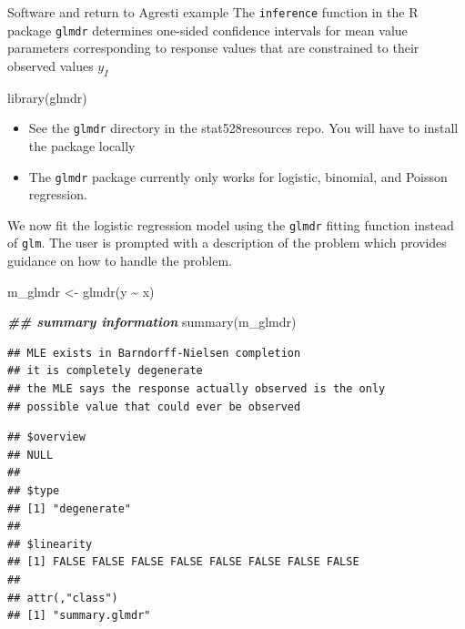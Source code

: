 \documentclass[
  ignorenonframetext,
]{beamer}
\newenvironment{Shaded}{\begin{snugshade}}{\end{snugshade}}
\newcommand{\DocumentationTok}[1]{\textcolor[rgb]{0.56,0.35,0.01}{\textbf{\textit{#1}}}}
\newcommand{\FunctionTok}[1]{\textcolor[rgb]{0.00,0.00,0.00}{#1}}
\newcommand{\NormalTok}[1]{#1}
\newcommand{\OtherTok}[1]{\textcolor[rgb]{0.56,0.35,0.01}{#1}}
\newcommand{\SpecialCharTok}[1]{\textcolor[rgb]{0.00,0.00,0.00}{#1}}
\providecommand{\tightlist}{%
  \setlength{\itemsep}{0pt}\setlength{\parskip}{0pt}}
\begin{document}
\begin{frame}[fragile]{Software and return to Agresti example}
\protect\hypertarget{software-and-return-to-agresti-example}{}
The \texttt{inference} function in the R package \texttt{glmdr}
determines one-sided confidence intervals for mean value parameters
corresponding to response values that are constrained to their observed
values \(y_I\)

\vspace{12pt}
\tiny

\begin{Shaded}
\begin{Highlighting}[]
\FunctionTok{library}\NormalTok{(glmdr)}
\end{Highlighting}
\end{Shaded}

\vspace{12pt}
\normalsize

\begin{itemize}
\tightlist
\item
  See the \texttt{glmdr} directory in the stat528resources repo. You
  will have to install the package locally
\item
  The \texttt{glmdr} package currently only works for logistic,
  binomial, and Poisson regression.
\end{itemize}
\end{frame}

\begin{frame}[fragile]{}
\protect\hypertarget{section-13}{}
We now fit the logistic regression model using the \texttt{glmdr}
fitting function instead of \texttt{glm}. The user is prompted with a
description of the problem which provides guidance on how to handle the
problem.

\vspace{12pt}
\tiny

\begin{Shaded}
\begin{Highlighting}[]
\NormalTok{m\_glmdr }\OtherTok{\textless{}{-}} \FunctionTok{glmdr}\NormalTok{(y }\SpecialCharTok{\textasciitilde{}}\NormalTok{ x)}

\DocumentationTok{\#\# summary information}
\FunctionTok{summary}\NormalTok{(m\_glmdr)}
\end{Highlighting}
\end{Shaded}

\begin{verbatim}
## MLE exists in Barndorff-Nielsen completion
## it is completely degenerate
## the MLE says the response actually observed is the only
## possible value that could ever be observed
\end{verbatim}

\begin{verbatim}
## $overview
## NULL
## 
## $type
## [1] "degenerate"
## 
## $linearity
## [1] FALSE FALSE FALSE FALSE FALSE FALSE FALSE FALSE
## 
## attr(,"class")
## [1] "summary.glmdr"
\end{verbatim}
\end{frame}
\end{document}
